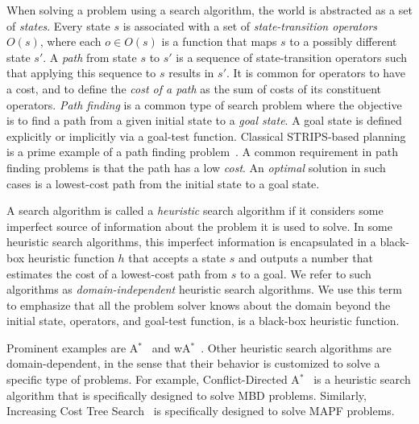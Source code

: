\documentclass{article}
\newcommand{\astar}{A$^*$\xspace}
\newcommand{\wastar}{wA$^*$\xspace}
\newcommand{\mbd}{\ac{MBD}\xspace}
\newcommand{\mapf}{\ac{MAPF}\xspace}
\begin{document}
When solving a problem using a search algorithm, 
the world is abstracted as a set of \emph{states}. 
Every state $s$ is associated with a set of \emph{state-transition operators} $O(s)$, where each $o\in O(s)$ is a function that maps $s$ to a possibly different state $s'$. 
A \emph{path} from state $s$ to $s'$ is a sequence of state-transition operators %
such that applying this sequence to $s$ results in $s'$.  
It is common for operators to have a cost, 
and to define the \emph{cost of a path} as the sum of costs of its constituent operators. 
\emph{Path finding} is a common type of search problem where the objective is to find a path from a given initial state to a \emph{goal state}. 
A goal state is defined explicitly or implicitly via a goal-test function. Classical STRIPS-based planning is a prime example of a path finding problem~\cite{bonet2001planning,fikes1971strips}. 
A common requirement in path finding problems is that the path has a low \emph{cost}. An \emph{optimal} solution in such cases is a lowest-cost path from the initial state to a goal state. 



A search algorithm is called a \emph{heuristic} search algorithm if it considers some imperfect source of information about the problem it is used to solve. In some heuristic search algorithms, this imperfect information is encapsulated in a black-box heuristic function $h$ that accepts a state $s$ and outputs a number that estimates the cost of a lowest-cost path from $s$ to a goal. We refer to such algorithms as \emph{domain-independent} heuristic search algorithms. We use this term to emphasize that all the problem solver knows about the domain beyond the initial state, operators, and goal-test function, is a black-box heuristic function. 


Prominent examples are \astar~\cite{hartNR68Astar} and \wastar~\cite{Pohl70HeuristicSearchPathFinding}. %
 Other heuristic search algorithms are domain-dependent, in the sense that their behavior is customized to solve a specific type of problems. For example, Conflict-Directed \astar~\cite{williams2007conflict} is a heuristic search algorithm that is specifically designed to solve \mbd problems. Similarly, Increasing Cost Tree Search~\cite{sharon2013increasing} is specifically designed to solve \mapf problems. 
 
\end{document}
